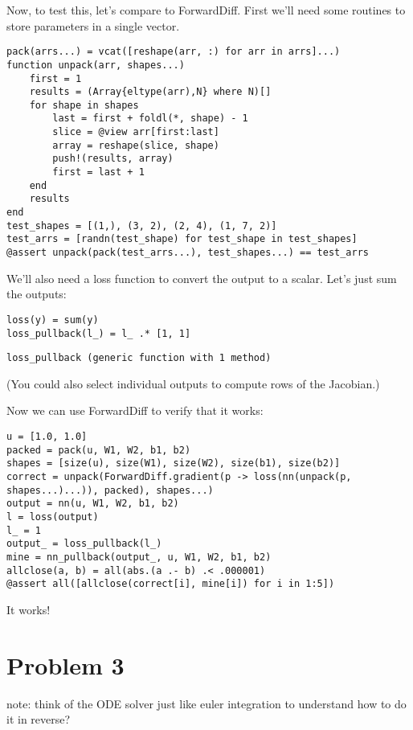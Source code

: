 \documentclass[11pt]{article}
\begin{document}
Now, to test this, let's compare to ForwardDiff. First we'll need some routines to store parameters in a single vector.
\begin{verbatim}
pack(arrs...) = vcat([reshape(arr, :) for arr in arrs]...)
function unpack(arr, shapes...)
    first = 1
    results = (Array{eltype(arr),N} where N)[]
    for shape in shapes
        last = first + foldl(*, shape) - 1
        slice = @view arr[first:last]
        array = reshape(slice, shape)
        push!(results, array)
        first = last + 1
    end
    results
end
test_shapes = [(1,), (3, 2), (2, 4), (1, 7, 2)]
test_arrs = [randn(test_shape) for test_shape in test_shapes]
@assert unpack(pack(test_arrs...), test_shapes...) == test_arrs
\end{verbatim}
We'll also need a loss function to convert the output to a scalar. Let's just sum the outputs:
\begin{verbatim}
loss(y) = sum(y)
loss_pullback(l_) = l_ .* [1, 1]
\end{verbatim}
\begin{verbatim}
loss_pullback (generic function with 1 method)
\end{verbatim}

(You could also select individual outputs to compute rows of the Jacobian.)

Now we can use ForwardDiff to verify that it works:
\begin{verbatim}
u = [1.0, 1.0]
packed = pack(u, W1, W2, b1, b2)
shapes = [size(u), size(W1), size(W2), size(b1), size(b2)]
correct = unpack(ForwardDiff.gradient(p -> loss(nn(unpack(p, shapes...)...)), packed), shapes...)
output = nn(u, W1, W2, b1, b2)
l = loss(output)
l_ = 1
output_ = loss_pullback(l_)
mine = nn_pullback(output_, u, W1, W2, b1, b2)
allclose(a, b) = all(abs.(a .- b) .< .000001)
@assert all([allclose(correct[i], mine[i]) for i in 1:5])
\end{verbatim}
It works!
\section{Problem 3}
\label{sec:orgab3613b}
note: think of the ODE solver just like euler integration to understand how to do it in reverse?
\end{document}
